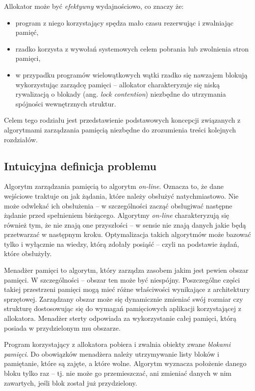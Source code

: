 \documentclass[12pt,a4paper,titlepage,twoside]{mwart}
\begin{document}
Allokator może być \textit{efektywny} wydajnościowo, co znaczy że:
\begin{itemize}
\item program z niego korzystający spędza mało czasu rezerwując i zwalniając
pamięć,
\item rzadko korzysta z wywołań systemowych celem pobrania lub zwolnienia stron
pamięci,
\item w przypadku programów wielowątkowych wątki rzadko się nawzajem blokują
wykorzystując zarządcę pamięci -- allokator charakteryzuje się niską
rywalizacją o blokady (ang. \textit{lock contention}) niezbędne do utrzymania
spójności wewnętrznych struktur.
\end{itemize}

Celem tego rodziału jest przedstawienie podstawowych koncepcji związanych z
algorytmami zarządzania pamięcią niezbędne do zrozumienia treści kolejnych
rozdziałów. 

\subsection{Intuicyjna definicja problemu}

Algorytm zarządzania pamięcią to algorytm \textit{on-line}. Oznacza to, że dane
wejściowe traktuje on jak żądania, które należy obsłużyć natychmiastowo. Nie
może odwlekać ich obsłużenia -- w szczególności zacząć obsługiwać następne
żądanie przed spełnieniem bieżącego. Algorytmy \textit{on-line} charakteryzują
się również tym, że nie znają one przyszłości -- w sensie nie znają danych
jakie będą przetwarzać w następnym kroku. Optymalizacja takich algorytmów może
bazować tylko i wyłącznie na wiedzy, którą zdołały posiąść -- czyli na
podstawie żądań, które obsłużyły.

Menadżer pamięci to algorytm, który zarządza zasobem jakim jest pewien obszar
pamięci. W szczególności -- obszar ten może być niespójny. Poszczególne części
takiej przestrzeni pamięci mogą mieć różne właściwości wynikające z
architektury sprzętowej. Zarządzany obszar może się dynamicznie zmieniać swój
rozmiar czy strukturę dostosowując się do wymagań pamięciowych aplikacji
korzystającej z allokatora. Menadżer sterty odpowiada za wykorzystanie całej
pamięci, którą posiada w przydzielonym mu obszarze.

Program korzystający z allokatora pobiera i zwalnia obiekty zwane
\textit{blokami pamięci}. Do obowiązków menadżera należy utrzymywanie listy
bloków i pamiętanie, które są zajęte, a które wolne. Algorytm wyznacza
położenie danego bloku tylko raz -- tj. nie może go przemieszczać, ani zmieniać
danych w nim zawartych, jeśli blok został już przydzielony.
\end{document}
